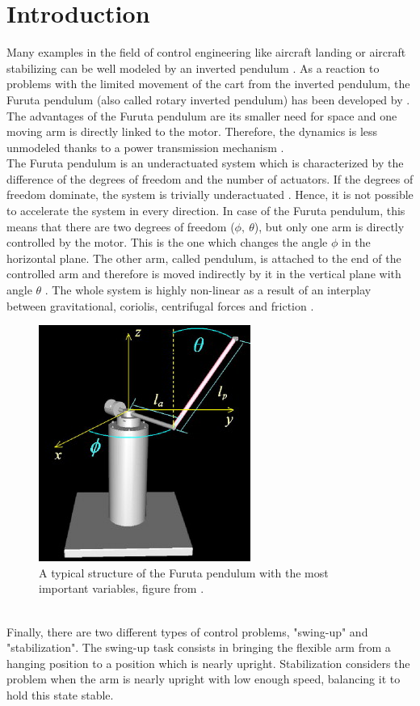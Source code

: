\section{Introduction}
Many examples in the field of control engineering like aircraft landing or 
aircraft stabilizing can be well modeled by an inverted 
pendulum \citep{akhtaruzzaman2010modeling}. As a reaction to problems with the 
limited movement of the cart from 
the inverted pendulum, the Furuta pendulum (also called rotary inverted 
pendulum) 
has been developed by 
\cite{furuta1992swing}. The advantages of the Furuta pendulum are its smaller 
need for space and one moving arm is directly linked to the motor. Therefore, 
the dynamics is less unmodeled thanks to a power transmission mechanism 
\citep{furuta1992swing}. \\
The Furuta pendulum is an underactuated system which is 
characterized by the difference of the degrees of freedom and the number of 
actuators. If the degrees of freedom dominate, the system is trivially 
underactuated \citep{tedrake2009underactuated}. Hence, it is not possible to 
accelerate the system in every direction. In case of the Furuta pendulum, this 
means that there are two degrees of freedom ($\phi,\ \theta$), 
but only one arm is directly controlled by the motor. This is the one which 
changes the angle $\phi$ in the horizontal plane. The other arm, called 
pendulum, 
is attached to 
the end of the controlled arm and therefore is moved indirectly by it in the 
vertical plane with angle $\theta$ 
\citep{spong1998underactuated,tedrake2009underactuated}. The whole system is 
highly non-linear as a result of an interplay between gravitational, coriolis, 
centrifugal forces and friction \citep{izutsu2008swing}.
\begin{figure}[h]
	\centering
	\includegraphics[width=0.5\linewidth]{pendulum}
	\caption{A typical structure of the Furuta pendulum with the most important 
	variables, figure from \cite{la2009new}.}
	\label{fig:pendulum}
\end{figure}\\
Finally, there are two different types of control problems, "swing-up" and 
"stabilization". The swing-up task consists in bringing the 
flexible arm from a hanging position to a position which is nearly upright. 
Stabilization considers the problem when the arm is nearly upright with low 
enough speed, balancing it to hold this state stable. 

